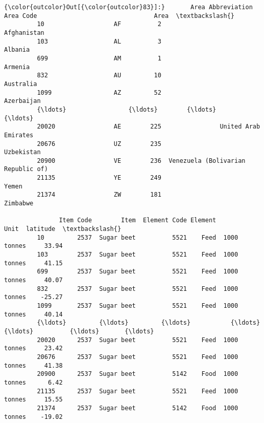 \documentclass[11pt]{article}
\begin{document}
\begin{Verbatim}[commandchars=\\\{\}]
{\color{outcolor}Out[{\color{outcolor}83}]:}       Area Abbreviation  Area Code                                Area  \textbackslash{}
         10                   AF          2                         Afghanistan   
         103                  AL          3                             Albania   
         699                  AM          1                             Armenia   
         832                  AU         10                           Australia   
         1099                 AZ         52                          Azerbaijan   
         {\ldots}                 {\ldots}        {\ldots}                                 {\ldots}   
         20020                AE        225                United Arab Emirates   
         20676                UZ        235                          Uzbekistan   
         20900                VE        236  Venezuela (Bolivarian Republic of)   
         21135                YE        249                               Yemen   
         21374                ZW        181                            Zimbabwe   
         
               Item Code        Item  Element Code Element         Unit  latitude  \textbackslash{}
         10         2537  Sugar beet          5521    Feed  1000 tonnes     33.94   
         103        2537  Sugar beet          5521    Feed  1000 tonnes     41.15   
         699        2537  Sugar beet          5521    Feed  1000 tonnes     40.07   
         832        2537  Sugar beet          5521    Feed  1000 tonnes    -25.27   
         1099       2537  Sugar beet          5521    Feed  1000 tonnes     40.14   
         {\ldots}         {\ldots}         {\ldots}           {\ldots}     {\ldots}          {\ldots}       {\ldots}   
         20020      2537  Sugar beet          5521    Feed  1000 tonnes     23.42   
         20676      2537  Sugar beet          5521    Feed  1000 tonnes     41.38   
         20900      2537  Sugar beet          5142    Food  1000 tonnes      6.42   
         21135      2537  Sugar beet          5521    Feed  1000 tonnes     15.55   
         21374      2537  Sugar beet          5142    Food  1000 tonnes    -19.02   
         

\end{Verbatim}
\end{document}
